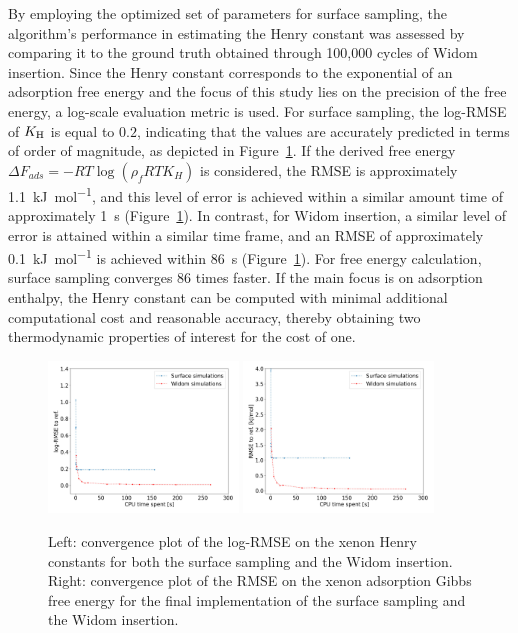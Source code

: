 \documentclass[main]{subfiles}
\begin{document}
By employing the optimized set of parameters for surface sampling, the algorithm's performance in estimating the Henry constant was assessed by comparing it to the ground truth obtained through 100,000 cycles of Widom insertion. Since the Henry constant corresponds to the exponential of an adsorption free energy and the focus of this study lies on the precision of the free energy, a log-scale evaluation metric is used. For surface sampling, the log-RMSE of $K_{\text{H}}$ is equal to $0.2$, indicating that the values are accurately predicted in terms of order of magnitude, as depicted in Figure~\ref{fgr:convergence_free_energy}. If the derived free energy $\Delta F_{ads} = -RT \log(\rho_fRT K_H)$ is considered, the RMSE is approximately \SI{1.1}{\kilo\joule\per\mole}, and this level of error is achieved within a similar amount time of approximately \SI{1}{\second} (Figure~\ref{fgr:convergence_free_energy}). In contrast, for Widom insertion, a similar level of error is attained within a similar time frame, and an RMSE of approximately \SI{0.1}{\kilo\joule\per\mole} is achieved within \SI{86}{\second} (Figure~\ref{fgr:convergence_free_energy}). For free energy calculation, surface sampling converges 86 times faster. If the main focus is on adsorption enthalpy, the Henry constant can be computed with minimal additional computational cost and reasonable accuracy, thereby obtaining two thermodynamic properties of interest for the cost of one.

\begin{figure}[ht]
  \centering
  \includegraphics[width=0.45\textwidth]{figures/3-fastsim/log_henry_convergence.jpg}
  \hfill
  \includegraphics[width=0.45\textwidth]{figures/3-fastsim/gibbs_free_energy_convergence.jpg}
  \caption{ Left: convergence plot of the log-RMSE on the xenon Henry constants for both the surface sampling and the Widom insertion. Right: convergence plot of the RMSE on the xenon adsorption Gibbs free energy for the final implementation of the surface sampling and the Widom insertion. }\label{fgr:convergence_free_energy}
\end{figure}
\end{document}
